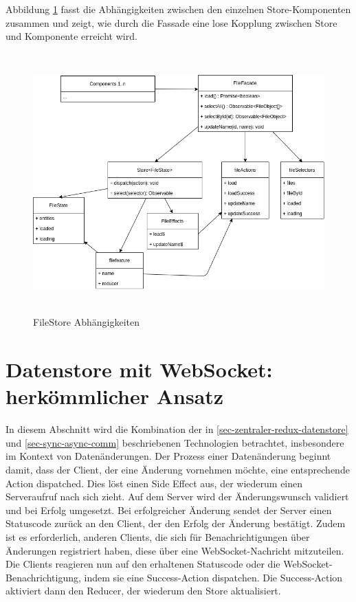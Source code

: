 \documentclass[12pt]{book}          %
\begin{document}
Abbildung \ref{fielStore-dependencies} fasst die Abhängigkeiten zwischen den einzelnen Store-Komponenten zusammen und zeigt, wie durch die Fassade eine lose Kopplung zwischen Store und Komponente erreicht wird.

\begin{figure}[htbp]
\centering
\includegraphics[height=10cm]{abbildungen/easy-state-comp.png}
\caption{FileStore Abhängigkeiten}
\label{fielStore-dependencies}
\end{figure}


\section{Datenstore mit WebSocket: herkömmlicher Ansatz}
\label{sec-datenstore-mit-websocket-herkoemmlicher-ansatz}

In diesem Abschnitt wird die Kombination der in \ref{sec-zentraler-redux-datenstore} und \ref{sec-sync-async-comm} beschriebenen Technologien betrachtet, insbesondere im Kontext von Datenänderungen. Der Prozess einer Datenänderung beginnt damit, dass der Client, der eine Änderung vornehmen möchte, eine entsprechende Action dispatched. Dies löst einen Side Effect aus, der wiederum einen Serveraufruf nach sich zieht. Auf dem Server wird der Änderungswunsch validiert und bei Erfolg umgesetzt. Bei erfolgreicher Änderung sendet der Server einen Statuscode zurück an den Client, der den Erfolg der Änderung bestätigt. Zudem ist es erforderlich, anderen Clients, die sich für Benachrichtigungen über Änderungen registriert haben, diese über eine WebSocket-Nachricht mitzuteilen. Die Clients reagieren nun auf den erhaltenen Statuscode oder die WebSocket-Benachrichtigung, indem sie eine Success-Action dispatchen. Die Success-Action aktiviert dann den Reducer, der wiederum den Store aktualisiert.
\end{document}
